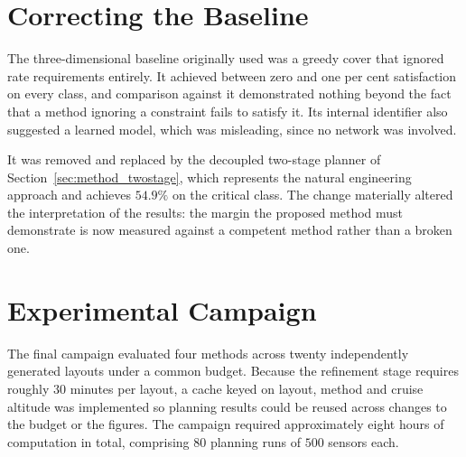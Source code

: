 \section{Correcting the Baseline}

The three-dimensional baseline originally used was a greedy cover that ignored rate requirements entirely. It achieved between zero and one per cent satisfaction on every class, and comparison against it demonstrated nothing beyond the fact that a method ignoring a constraint fails to satisfy it. Its internal identifier also suggested a learned model, which was misleading, since no network was involved.

It was removed and replaced by the decoupled two-stage planner of Section~\ref{sec:method_twostage}, which represents the natural engineering approach and achieves $54.9\%$ on the critical class. The change materially altered the interpretation of the results: the margin the proposed method must demonstrate is now measured against a competent method rather than a broken one.

\section{Experimental Campaign}

The final campaign evaluated four methods across twenty independently generated layouts under a common budget. Because the refinement stage requires roughly $30$ minutes per layout, a cache keyed on layout, method and cruise altitude was implemented so planning results could be reused across changes to the budget or the figures. The campaign required approximately eight hours of computation in total, comprising $80$ planning runs of $500$ sensors each.
